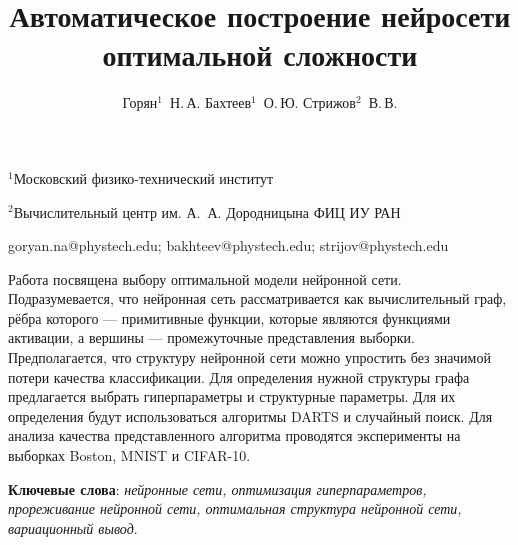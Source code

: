 \documentclass[12pt,twoside]{article}
\begin{document}
\title
    {Автоматическое построение нейросети оптимальной сложности}
\author
    {Горян$^1$~Н.\,А. Бахтеев$^1$~О.\,Ю.  Стрижов$^2$~В.\,В.} %

\organization
    {$^1$Московский физико-технический институт\par
    $^2$Вычислительный центр им. А.~А. Дородницына ФИЦ ИУ РАН}

\email
    {goryan.na@phystech.edu; bakhteev@phystech.edu; strijov@phystech.edu}    


    

\abstract
	{Работа посвящена выбору оптимальной модели нейронной сети. Подразумевается, что нейронная сеть рассматривается как вычислительный граф, рёбра которого --- примитивные функции, которые являются функциями активации, а вершины --- промежуточные представления выборки. Предполагается, что структуру нейронной сети можно упростить без значимой потери качества классификации. Для определения нужной структуры графа предлагается выбрать гиперпараметры и структурные параметры. Для их определения будут использоваться алгоритмы DARTS и случайный поиск. Для анализа качества представленного алгоритма проводятся эксперименты на выборках Boston, MNIST и CIFAR-10.

\bigskip

\textbf{Ключевые слова}: \emph {нейронные сети, оптимизация гиперпараметров, прореживание нейронной сети, оптимальная структура нейронной сети, вариационный вывод}.
}


\maketitle
\end{document}
